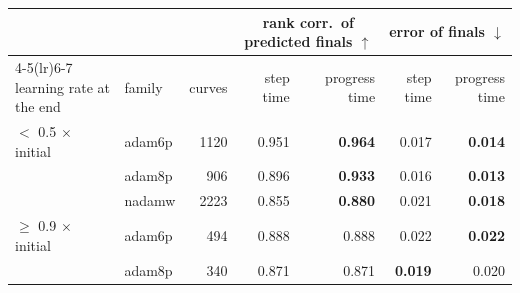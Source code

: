 \begin{tabular}{llrrrrr}
\toprule
 & & & \multicolumn{2}{c}{rank corr.\ of predicted finals $\uparrow$} & \multicolumn{2}{c}{error of finals $\downarrow$} \\
\cmidrule(lr){4-5}\cmidrule(lr){6-7}
learning rate at the end & family & curves & step time & progress time & step time & progress time \\
\midrule
$<$ 0.5 $\times$ initial & adam6p & 1120 & 0.951 & \textbf{0.964} & 0.017 & \textbf{0.014} \\
 & adam8p & 906 & 0.896 & \textbf{0.933} & 0.016 & \textbf{0.013} \\
 & nadamw & 2223 & 0.855 & \textbf{0.880} & 0.021 & \textbf{0.018} \\
$\ge$ 0.9 $\times$ initial & adam6p & 494 & 0.888 & 0.888 & 0.022 & \textbf{0.022} \\
 & adam8p & 340 & 0.871 & 0.871 & \textbf{0.019} & 0.020 \\
\bottomrule
\end{tabular}
